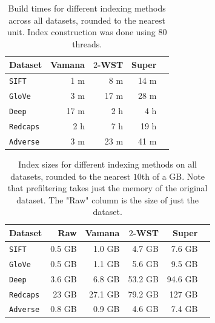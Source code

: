 \documentclass{article}
\theoremstyle{plain}
\theoremstyle{definition}
\theoremstyle{remark}
\newcommand{\datasetname}[1]{\texttt{#1}}
\begin{document}
\begin{table}[t]
\footnotesize
\caption{Build times for different indexing methods across all datasets, rounded to the nearest unit. Index construction was done using $80$ threads.}
\vspace{0.1cm}
\centering
\begin{tabular}{|l|r|r|r|r|}
\hline
\textbf{Dataset} & \textbf{Vamana} & \textbf{$2$-WST} & \textbf{Super} \\
\hline
\datasetname{SIFT}  & 1 m & 8 m & 14 m\\
\datasetname{GloVe}  & 3 m & 17 m & 28 m \\
\datasetname{Deep}  & 17 m & 2 h & 4 h  \\
\datasetname{Redcaps} & 2 h & 7 h & 19 h \\
\datasetname{Adverse} & 3 m & 23 m & 41 m \\
\hline
\end{tabular}
\vspace{0.1cm}
\label{table:build-times-datasets}
\end{table}

\begin{table}[t]
\centering

\caption{Index sizes for different indexing methods on all datasets, rounded to the nearest $10$th of a GB. Note that prefiltering takes just the memory of the original dataset. The "Raw" column is the size of just the dataset.}
\footnotesize
\begin{tabular}{|l|r|r|r|r|r|}
\hline
\textbf{Dataset} & \textbf{Raw} & \textbf{Vamana} & \textbf{$2$-WST} & \textbf{Super} \\
\hline
\datasetname{SIFT}  & 0.5 GB & 1.0 GB &  4.7 GB & 7.6 GB\\
\datasetname{GloVe}  & 0.5 GB & 1.1 GB & 5.6 GB & 9.5 GB \\
\datasetname{Deep} & 3.6 GB & 6.8 GB &  53.2 GB&  94.6 GB\\
\datasetname{Redcaps} & 23 GB & 27.1 GB & 79.2 GB & 127 GB \\
\datasetname{Adverse} & 0.8 GB & 0.9 GB & 4.6 GB & 7.4 GB \\
\hline
\end{tabular}
\vspace{0.1cm}
\label{table:index-sizes-datasets}
\end{table}
\end{document}
